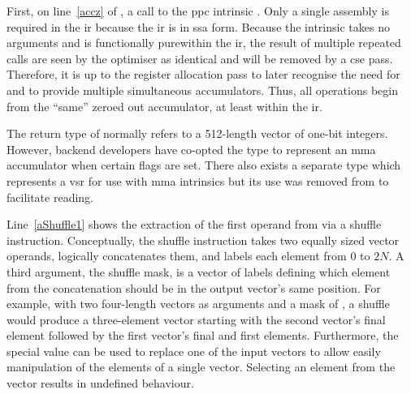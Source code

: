 \documentclass[\main/thesis.tex]{subfiles}
\begin{document}
First, on line~\ref{accz} of , a call to the \gls{ppc} \gls{intrinsic} \footnotemark.
Only a single assembly is required in the \gls{ir} because the \gls{ir} is in \gls{ssa} form.
Because the intrinsic takes no arguments and is functionally pure\footnotemark within the \gls{ir}, the result of multiple repeated calls are seen by the optimiser as identical and will be removed by a \gls{cse} pass.
Therefore, it is up to the register allocation pass to later recognise the need for and to provide multiple simultaneous accumulators.
Thus, all operations begin from the ``same'' zeroed out accumulator, at least within the \gls{ir}.

The  return type of  normally refers to a 512-length vector of one-bit integers.
However, backend developers have co-opted the type to represent an \gls{mma} accumulator when certain flags are set.
There also exists a separate type which represents a \gls{vsr} for use with \gls{mma} \glspl{intrinsic} but its use was removed from  to facilitate reading\footnotemark.

Line~\ref{aShuffle1} shows the extraction of the first operand from  via a shuffle instruction.
Conceptually, the shuffle instruction takes two equally sized vector operands, logically concatenates them, and labels each element from $0$ to $2N$.
A third argument, the shuffle mask, is a vector of labels defining which element from the concatenation should be in the output vector's same position.
For example, with two four-length vectors as arguments and a mask of , a shuffle would produce a three-element vector starting with the second vector's final element followed by the first vector's final and first elements.
Furthermore, the special value  can be used to replace one of the input vectors to allow easily manipulation of the elements of a single vector.
Selecting an element from the  vector results in undefined behaviour.
\end{document}
